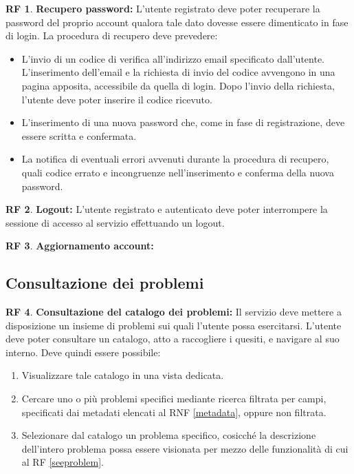 \documentclass[11pt, a4paper]{article}
\theoremstyle{definition}
\newtheorem{funcreq}{RF} %
\begin{document}
\begin{funcreq}
\textbf{Recupero password:}
L'utente registrato deve poter recuperare la password del proprio account
qualora tale dato dovesse essere dimenticato in fase di login. La procedura
di recupero deve prevedere:
\begin{itemize}
    \item L'invio di un codice di verifica all'indirizzo email specificato
    dall'utente. L'inserimento dell'email e la richiesta di invio del
    codice avvengono in una pagina apposita, accessibile da quella di login.
    Dopo l'invio della richiesta, l'utente deve poter inserire il codice
    ricevuto.

    \item L'inserimento di una nuova password che, come in fase di registrazione,
    deve essere scritta e confermata.

    \item La notifica di eventuali errori avvenuti durante la procedura
    di recupero, quali codice errato e incongruenze nell'inserimento
    e conferma della nuova password.
\end{itemize}
\end{funcreq}

\begin{funcreq}
\textbf{Logout:}
L'utente registrato e autenticato deve poter interrompere la sessione di
accesso al servizio effettuando un logout.
\end{funcreq}

\begin{funcreq}
\textbf{Aggiornamento account:}

\end{funcreq}

\subsection{Consultazione dei problemi}

\begin{funcreq}
\textbf{Consultazione del catalogo dei problemi:}
Il servizio deve mettere a disposizione un insieme di problemi sui quali
l'utente possa esercitarsi. L'utente deve poter consultare un catalogo,
atto a raccogliere i quesiti, e navigare al suo interno. Deve quindi
essere possibile:
\begin{enumerate}
    \item Visualizzare tale catalogo in una vista dedicata.
    
    \item Cercare uno o più problemi specifici mediante ricerca filtrata
    per campi, specificati dai metadati elencati al RNF \ref{metadata},
    oppure non filtrata.

    \item Selezionare dal catalogo un problema specifico, cosicché la
    descrizione dell'intero problema possa essere visionata per mezzo
    delle funzionalità di cui al RF \ref{seeproblem}.
\end{enumerate}
\end{funcreq}
\end{document}
